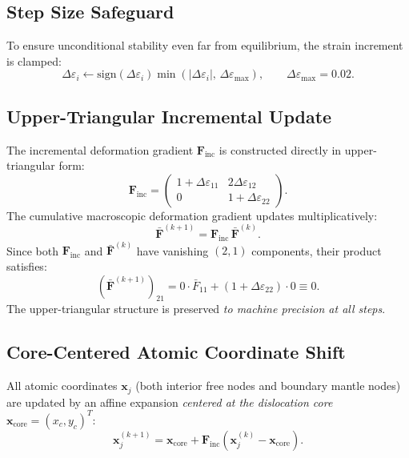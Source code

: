 \documentclass[11pt,a4paper]{article}
\begin{document}
\subsection{Step Size Safeguard}

To ensure unconditional stability even far from equilibrium, the strain increment is clamped:
\begin{equation}
\Delta\varepsilon_i \longleftarrow \mathrm{sign}(\Delta\varepsilon_i) \min\left( |\Delta\varepsilon_i|, \, \Delta\varepsilon_{\max} \right), \qquad \Delta\varepsilon_{\max} = 0.02.
\end{equation}

\subsection{Upper-Triangular Incremental Update}

The incremental deformation gradient $\mathbf{F}_{\text{inc}}$ is constructed directly in upper-triangular form:
\begin{equation}
\label{eq:F_inc}
\mathbf{F}_{\text{inc}} = \begin{pmatrix}
1 + \Delta\varepsilon_{11} & 2\Delta\varepsilon_{12} \\
0 & 1 + \Delta\varepsilon_{22}
\end{pmatrix}.
\end{equation}
The cumulative macroscopic deformation gradient updates multiplicatively:
\begin{equation}
\bar{\mathbf{F}}^{(k+1)} = \mathbf{F}_{\text{inc}} \, \bar{\mathbf{F}}^{(k)}.
\end{equation}
Since both $\mathbf{F}_{\text{inc}}$ and $\bar{\mathbf{F}}^{(k)}$ have vanishing $(2,1)$ components, their product satisfies:
\begin{equation}
(\bar{\mathbf{F}}^{(k+1)})_{21} = 0 \cdot \bar{F}_{11} + (1 + \Delta\varepsilon_{22}) \cdot 0 \equiv 0.
\end{equation}
The upper-triangular structure is preserved \emph{to machine precision at all steps}.

\subsection{Core-Centered Atomic Coordinate Shift}

All atomic coordinates $\mathbf{x}_j$ (both interior free nodes and boundary mantle nodes) are updated by an affine expansion \emph{centered at the dislocation core} $\mathbf{x}_{\text{core}} = (x_c, y_c)^T$:
\begin{equation}
\label{eq:coord_update}
\mathbf{x}_j^{(k+1)} = \mathbf{x}_{\text{core}} + \mathbf{F}_{\text{inc}} \left( \mathbf{x}_j^{(k)} - \mathbf{x}_{\text{core}} \right).
\end{equation}
\end{document}
